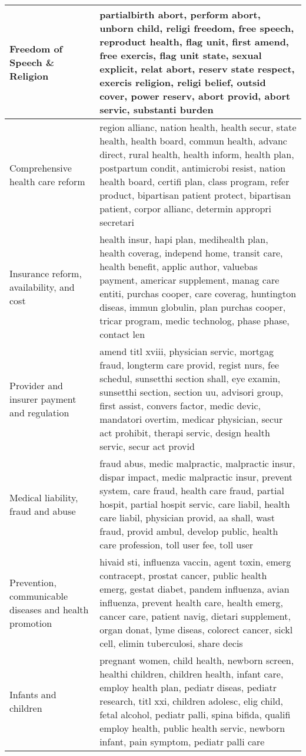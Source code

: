 \begin{longtable}{p{}p{}}
   \hline
Freedom of Speech \& Religion & partialbirth abort, perform abort, unborn child, religi freedom, free speech, reproduct health, flag unit, first amend, free exercis, flag unit state, sexual explicit, relat abort, reserv state respect, exercis religion, religi belief, outsid cover, power reserv, abort provid, abort servic, substanti burden \\ 
   \hline
Comprehensive health care reform & region allianc, nation health, health secur, state health, health board, commun health, advanc direct, rural health, health inform, health plan, postpartum condit, antimicrobi resist, nation health board, certifi plan, class program, refer product, bipartisan patient protect, bipartisan patient, corpor allianc, determin appropri secretari \\ 
   \hline
Insurance reform, availability, and cost & health insur, hapi plan, medihealth plan, health coverag, independ home, transit care, health benefit, applic author, valuebas payment, americar supplement, manag care entiti, purchas cooper, care coverag, huntington diseas, immun globulin, plan purchas cooper, tricar program, medic technolog, phase phase, contact len \\ 
   \hline
Provider and insurer payment and regulation & amend titl xviii, physician servic, mortgag fraud, longterm care provid, regist nurs, fee schedul, sunsetthi section shall, eye examin, sunsetthi section, section uu, advisori group, first assist, convers factor, medic devic, mandatori overtim, medicar physician, secur act prohibit, therapi servic, design health servic, secur act provid \\ 
   \hline
Medical liability, fraud and abuse & fraud abus, medic malpractic, malpractic insur, dispar impact, medic malpractic insur, prevent system, care fraud, health care fraud, partial hospit, partial hospit servic, care liabil, health care liabil, physician provid, aa shall, wast fraud, provid ambul, develop public, health care profession, toll user fee, toll user \\ 
   \hline
Prevention, communicable diseases and health promotion & hivaid sti, influenza vaccin, agent toxin, emerg contracept, prostat cancer, public health emerg, gestat diabet, pandem influenza, avian influenza, prevent health care, health emerg, cancer care, patient navig, dietari supplement, organ donat, lyme diseas, colorect cancer, sickl cell, elimin tuberculosi, share decis \\ 
   \hline
Infants and children & pregnant women, child health, newborn screen, healthi children, children health, infant care, employ health plan, pediatr diseas, pediatr research, titl xxi, children adolesc, elig child, fetal alcohol, pediatr palli, spina bifida, qualifi employ health, public health servic, newborn infant, pain symptom, pediatr palli care \\ 

\end{longtable}
